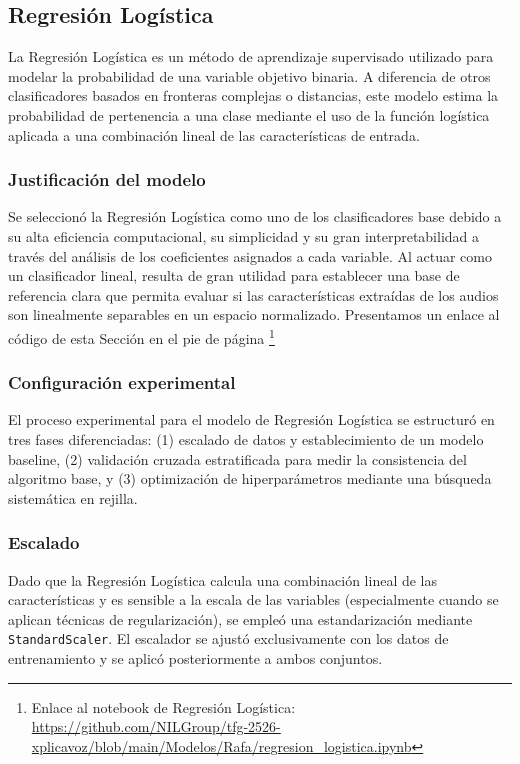 \subsection{Regresión Logística}
\label{subsubsec:mod_lr}

La Regresión Logística es un método de aprendizaje supervisado utilizado para modelar la probabilidad de una variable objetivo binaria. A diferencia de otros clasificadores basados en fronteras complejas o distancias, este modelo estima la probabilidad de pertenencia a una clase mediante el uso de la función logística aplicada a una combinación lineal de las características de entrada.

\subsubsection*{Justificación del modelo}

Se seleccionó la Regresión Logística como uno de los clasificadores base debido a su alta eficiencia computacional, su simplicidad y su gran interpretabilidad a través del análisis de los coeficientes asignados a cada variable. Al actuar como un clasificador lineal, resulta de gran utilidad para establecer una base de referencia clara que permita evaluar si las características extraídas de los audios son linealmente separables en un espacio normalizado. Presentamos un enlace al código de esta Sección en el pie de página \footnote{Enlace al notebook de Regresión Logística: \url{https://github.com/NILGroup/tfg-2526-xplicavoz/blob/main/Modelos/Rafa/regresion_logistica.ipynb}}

\subsubsection*{Configuración experimental}

El proceso experimental para el modelo de Regresión Logística se estructuró en tres fases diferenciadas: (1) escalado de datos y establecimiento de un modelo baseline, (2) validación cruzada estratificada para medir la consistencia del algoritmo base, y (3) optimización de hiperparámetros mediante una búsqueda sistemática en rejilla.

\subsubsection*{Escalado}

Dado que la Regresión Logística calcula una combinación lineal de las características y es sensible a la escala de las variables (especialmente cuando se aplican técnicas de regularización), se empleó una estandarización mediante \texttt{StandardScaler}. El escalador se ajustó exclusivamente con los datos de entrenamiento y se aplicó posteriormente a ambos conjuntos.

